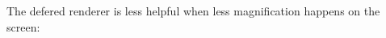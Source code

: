 \begin{minipage}{\textwidth}
\begin{figure}[H]
 \centering
\end{figure}
\begin{figure}[H]
 \centering
\end{figure}
\end{minipage}


The defered renderer is less helpful when less magnification happens on the screen:\\
\par

\begin{minipage}{\textwidth}
\begin{figure}[H]
 \centering
\end{figure}


\begin{figure}[H]
 \centering
\end{figure}
\end{minipage}























